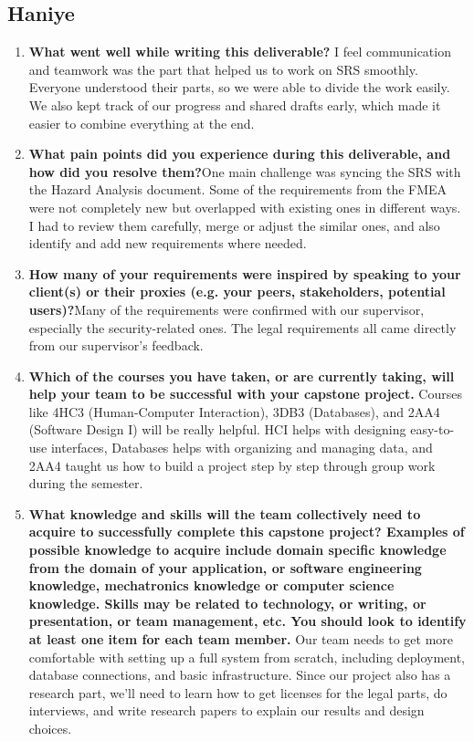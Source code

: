 \subsection*{Haniye}
\begin{enumerate}
  \item \textbf{What went well while writing this deliverable?} I feel communication and teamwork was the part that helped us to work on SRS smoothly. Everyone understood their parts, so we were able to divide the work easily. We also kept track of our progress and shared drafts early, which made it easier to combine everything at the end.
  \item \textbf{What pain points did you experience during this deliverable, and how did
  you resolve them?}One main challenge was syncing the SRS with the Hazard Analysis document. Some of the requirements from the FMEA were not completely new but overlapped with existing ones in different ways. I had to review them carefully, merge or adjust the similar ones, and also identify and add new requirements where needed.
  \item \textbf{How many of your requirements were inspired by speaking to your
  client(s) or their proxies (e.g. your peers, stakeholders, potential users)?}Many of the requirements were confirmed with our supervisor, especially the security-related ones. The legal requirements all came directly from our supervisor’s feedback.
  \item \textbf{Which of the courses you have taken, or are currently taking, will help
  your team to be successful with your capstone project.}
  Courses like 4HC3 (Human-Computer Interaction), 3DB3 (Databases), and 2AA4 (Software Design I) will be really helpful. HCI helps with designing easy-to-use interfaces, Databases helps with organizing and managing data, and 2AA4 taught us how to build a project step by step through group work during the semester.
  \item \textbf{What knowledge and skills will the team collectively need to acquire to
  successfully complete this capstone project?  Examples of possible knowledge
  to acquire include domain specific knowledge from the domain of your
  application, or software engineering knowledge, mechatronics knowledge or
  computer science knowledge.  Skills may be related to technology, or writing,
  or presentation, or team management, etc.  You should look to identify at
  least one item for each team member.}
  Our team needs to get more comfortable with setting up a full system from scratch, including deployment, database connections, and basic infrastructure. Since our project also has a research part, we’ll need to learn how to get licenses for the legal parts, do interviews, and write research papers to explain our results and design choices.

\end{enumerate}
